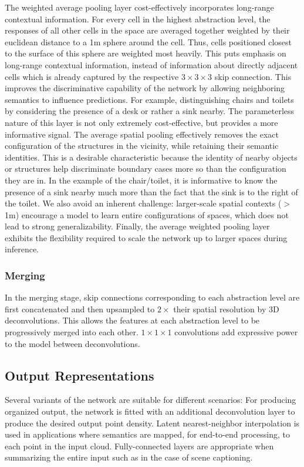 \documentclass[runningheads]{llncs}
\begin{document}
The weighted average pooling layer cost-effectively incorporates long-range contextual information. For every cell in the highest abstraction level, the responses of all other cells in the space are averaged together weighted by their euclidean distance to a 1m sphere around the cell. Thus, cells positioned closest to the surface of this sphere are weighted most heavily. This puts emphasis on long-range contextual information, instead of information about directly adjacent cells which is already captured by the respective $3\times 3\times 3$ skip connection. This improves the discriminative capability of the network by allowing neighboring semantics to influence predictions. For example, distinguishing chairs and toilets by considering the presence of a desk or rather a sink nearby. The parameterless nature of this layer is not only extremely cost-effective, but provides a more informative signal. The average spatial pooling effectively removes the exact configuration of the structures in the vicinity, while retaining their semantic identities. This is a desirable characteristic because the identity of nearby objects or structures help discriminate boundary cases more so than the configuration they are in. In the example of the chair/toilet, it is informative to know the presence of a sink nearby much more than the fact that the sink is to the right of the toilet. We also avoid an inherent challenge: larger-scale spatial contexts ($>$1m) encourage a model to learn entire configurations of spaces, which does not lead to strong generalizability. Finally, the average weighted pooling layer exhibits the flexibility required to scale the network up to larger spaces during inference.

\subsubsection{Merging}
In the merging stage, skip connections corresponding to each abstraction level are first concatenated and then upsampled to $2\times$ their spatial resolution by 3D deconvolutions. This allows the features at each abstraction level to be progressively merged into each other. $1\times 1\times 1$ convolutions add expressive power to the model between deconvolutions.

\subsection{Output Representations}

Several variants of the network are suitable for different scenarios: For producing organized output, the network is fitted with an additional deconvolution layer to produce the desired output point density. Latent nearest-neighbor interpolation is used in applications where semantics are mapped, for end-to-end processing, to each point in the input cloud. Fully-connected layers are appropriate when summarizing the entire input such as in the case of scene captioning.\\
\end{document}
